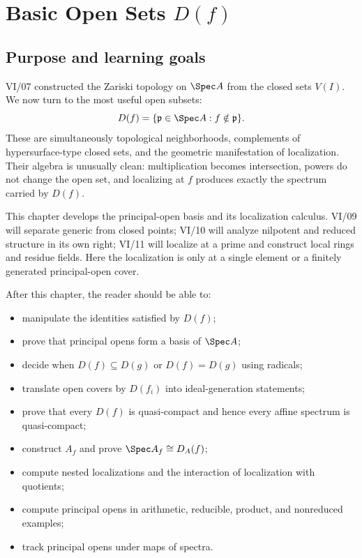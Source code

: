 
\chapter{Basic Open Sets \texorpdfstring{$D(f)$}{D(f)}}
\label{ch:basic-open-sets}

\section*{Purpose and learning goals}

VI/07 constructed the Zariski topology on $\Spec A$ from the closed sets $V(I)$.  We now
turn to the most useful open subsets:
\[
D(f)=\{\mathfrak p\in\Spec A:f\notin\mathfrak p\}.
\]
These are simultaneously topological neighborhoods, complements of hypersurface-type
closed sets, and the geometric manifestation of localization.  Their algebra is unusually
clean: multiplication becomes intersection, powers do not change the open set, and
localizing at $f$ produces exactly the spectrum carried by $D(f)$.

This chapter develops the principal-open basis and its localization calculus.  VI/09 will
separate generic from closed points; VI/10 will analyze nilpotent and reduced structure in
its own right; VI/11 will localize at a prime and construct local rings and residue fields.
Here the localization is only at a single element or a finitely generated principal-open
cover.

After this chapter, the reader should be able to:
\begin{itemize}
\item manipulate the identities satisfied by $D(f)$;
\item prove that principal opens form a basis of $\Spec A$;
\item decide when $D(f)\subseteq D(g)$ or $D(f)=D(g)$ using radicals;
\item translate open covers by $D(f_i)$ into ideal-generation statements;
\item prove that every $D(f)$ is quasi-compact and hence every affine spectrum is quasi-compact;
\item construct $A_f$ and prove $\Spec A_f\cong D_A(f)$;
\item compute nested localizations and the interaction of localization with quotients;
\item compute principal opens in arithmetic, reducible, product, and nonreduced examples;
\item track principal opens under maps of spectra.
\end{itemize}

